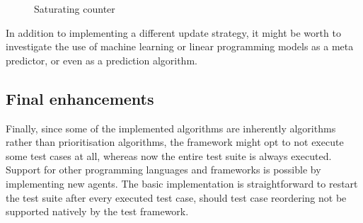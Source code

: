 \begin{figure}[htbp!]
	\centering
	
	\caption{Saturating counter}
	\label{fig:saturating-counter}
\end{figure}

In addition to implementing a different update strategy, it might be worth to investigate the use of machine learning or linear programming models as a meta predictor, or even as a prediction algorithm.

\subsection{Final enhancements}
Finally, since some of the implemented algorithms are inherently \tsm{} algorithms rather than prioritisation algorithms, the framework might opt to not execute some test cases at all, whereas now the entire test suite is always executed.\\

\noindent Support for other programming languages and frameworks is possible by implementing new agents. The basic implementation is straightforward to restart the test suite after every executed test case, should test case reordering not be supported natively by the test framework.
